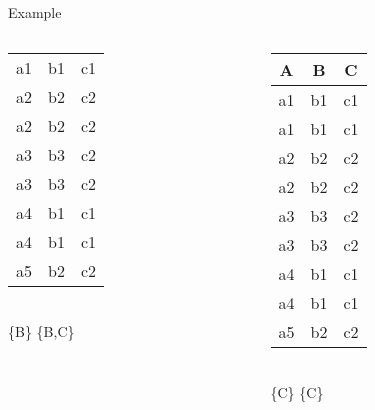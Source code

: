 \begin{frame}{Example}
\begin{columns}
\begin{column}{0.32\textwidth}
\begin{table}[t]
\begin{tabular}{ccc}
\rowcolor{Dandelion}
a1 & b1 & c1 \\
\rowcolor{lightgray}
a2 & b2 & c2 \\
\rowcolor{lightgray}
a2 & b2 & c2 \\
\rowcolor{Thistle}
a3 & b3 & c2 \\
\rowcolor{Thistle}
a3 & b3 & c2 \\
\rowcolor{Dandelion}
a4 & b1 & c1 \\
\rowcolor{Dandelion}
a4 & b1 & c1 \\
\rowcolor{lightgray}
a5 & b2 & c2 \\
\bottomrule
\end{tabular}\\
\pause
\{\alert{B}\} \rightarrow \{B,C\}
\end{table}
    \end{column}
    \pause
    \begin{column}{0.32\textwidth}
        \begin{table}[t]
\centering
\begin{tabular}{ccc}
\toprule
\textbf{A} & \textbf{B} & \textbf{\alert{C}} \\
\toprule
\rowcolor{Dandelion}
a1 & b1 & c1 \\
\rowcolor{Dandelion}
a1 & b1 & c1 \\
\rowcolor{lightgray}
a2 & b2 & c2 \\
\rowcolor{lightgray}
a2 & b2 & c2 \\
\rowcolor{lightgray}
a3 & b3 & c2 \\
\rowcolor{lightgray}
a3 & b3 & c2 \\
\rowcolor{Dandelion}
a4 & b1 & c1 \\
\rowcolor{Dandelion}
a4 & b1 & c1 \\
\rowcolor{lightgray}
a5 & b2 & c2 \\
\bottomrule
\end{tabular}\\
\pause
\{\alert{C}\} \rightarrow \{C\}
\end{table}
    \end{column}
\end{columns}
\end{frame}